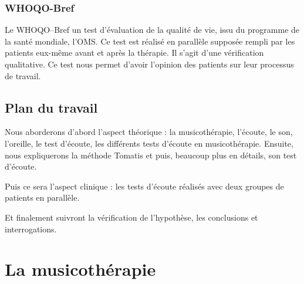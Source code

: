 	
	\subsection{WHOQO-Bref}
        
   Le WHOQO--Bref un test d'évaluation de la qualité de vie, issu du
	programme de la santé mondiale, l'OMS.
	Ce test est réalisé en parallèle supposée rempli par les patients eux-même  avant et après la thérapie.
	Il s'agit d'une vérification qualitative. Ce test nous permet d'avoir l'opinion des patients sur leur processus de travail.
	
	
	 
\section{Plan du travail}

Nous aborderons d'abord l'aspect théorique : la musicothérapie, l'écoute, le son, l'oreille, le 
test d'écoute, les différents tests d'écoute en musicothérapie.  Ensuite, nous 
expliquerons  la méthode Tomatis
et puis, beaucoup plus en détails, son test d'écoute.

Puis ce sera l'aspect clinique : les tests d'écoute réalisés  avec deux groupes 
de patients en parallèle.

Et finalement suivront la vérification de l'hypothèse, les conclusions et 
interrogations. 


	


\chapter{La musicothérapie}

